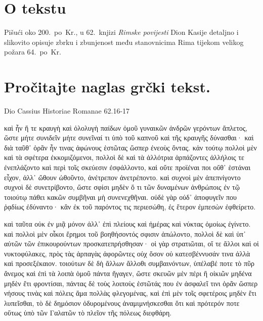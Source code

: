


\section*{O tekstu}

Pišući oko 200.\ po~Kr., u 62.\ knjizi \textit{Rimske povijesti} Dion Kasije detaljno i slikovito opisuje zbrku i zbunjenost među stanovnicima Rima tijekom velikog požara 64.\ po~Kr.


\section*{Pročitajte naglas grčki tekst.}

Dio Cassius Historiae Romanae 62.16-17

\medskip


{\large

\begin{greek}

\noindent καὶ ἦν ἥ τε κραυγὴ καὶ ὀλολυγὴ παίδων ὁμοῦ γυναικῶν ἀνδρῶν γερόντων ἄπλετος, ὥστε μήτε συνιδεῖν μήτε συνεῖναί τι ὑπὸ τοῦ καπνοῦ καὶ τῆς κραυγῆς δύνασθαι· καὶ διὰ ταῦθ᾽ ὁρᾶν ἦν τινας ἀφώνους ἑστῶτας ὥσπερ ἐνεοὺς ὄντας. κἀν τούτῳ πολλοὶ μὲν καὶ τὰ σφέτερα ἐκκομιζόμενοι, πολλοὶ δὲ καὶ τὰ ἀλλότρια ἁρπάζοντες ἀλλήλοις τε ἐνεπλάζοντο καὶ περὶ τοῖς σκεύεσιν ἐσφάλλοντο, καὶ οὔτε προϊέναι ποι οὔθ᾽ ἑστάναι εἶχον, ἀλλ᾽ ὤθουν ὠθοῦντο, ἀνέτρεπον ἀνετρέποντο. καὶ συχνοὶ μὲν ἀπεπνίγοντο συχνοὶ δὲ συνετρίβοντο, ὥστε σφίσι μηδὲν ὅ τι τῶν δυναμένων ἀνθρώποις ἐν τῷ τοιούτῳ πάθει κακῶν συμβῆναι μὴ συνενεχθῆναι. οὐδὲ γὰρ οὐδ᾽ ἀποφυγεῖν που ῥᾳδίως ἐδύναντο· κἂν ἐκ τοῦ παρόντος τις περιεσώθη, ἐς ἕτερον ἐμπεσὼν ἐφθείρετο.

\noindent καὶ ταῦτα οὐκ ἐν μιᾷ μόνον ἀλλ᾽ ἐπὶ πλείους καὶ ἡμέρας καὶ νύκτας ὁμοίως ἐγίνετο. καὶ πολλοὶ μὲν οἶκοι ἔρημοι τοῦ βοηθήσοντός σφισιν ἀπώλοντο, πολλοὶ δὲ καὶ ὑπ᾽ αὐτῶν τῶν ἐπικουρούντων προσκατεπρήσθησαν· οἱ γὰρ στρατιῶται, οἵ τε ἄλλοι καὶ οἱ νυκτοφύλακες, πρὸς τὰς ἁρπαγὰς ἀφορῶντες οὐχ ὅσον οὐ κατεσβέννυσάν τινα ἀλλὰ καὶ προσεξέκαιον. τοιούτων δὲ δὴ ἄλλων ἄλλοθι συμβαινόντων, ὑπέλαβέ ποτε τὸ πῦρ ἄνεμος καὶ ἐπὶ τὰ λοιπὰ ὁμοῦ πάντα ἤγαγεν, ὥστε σκευῶν μὲν πέρι ἢ οἰκιῶν μηδένα μηδὲν ἔτι φροντίσαι, πάντας δὲ τοὺς λοιποὺς ἑστῶτάς που ἐν ἀσφαλεῖ τινι ὁρᾶν ὥσπερ νήσους τινὰς καὶ πόλεις ἅμα πολλὰς φλεγομένας, καὶ ἐπὶ μὲν τοῖς σφετέροις μηδὲν ἔτι λυπεῖσθαι, τὸ δὲ δημόσιον ὀδυρομένους ἀναμιμνήσκεσθαι ὅτι καὶ πρότερόν ποτε οὕτως ὑπὸ τῶν Γαλατῶν τὸ πλεῖον τῆς πόλεως διεφθάρη.

\end{greek}

}

